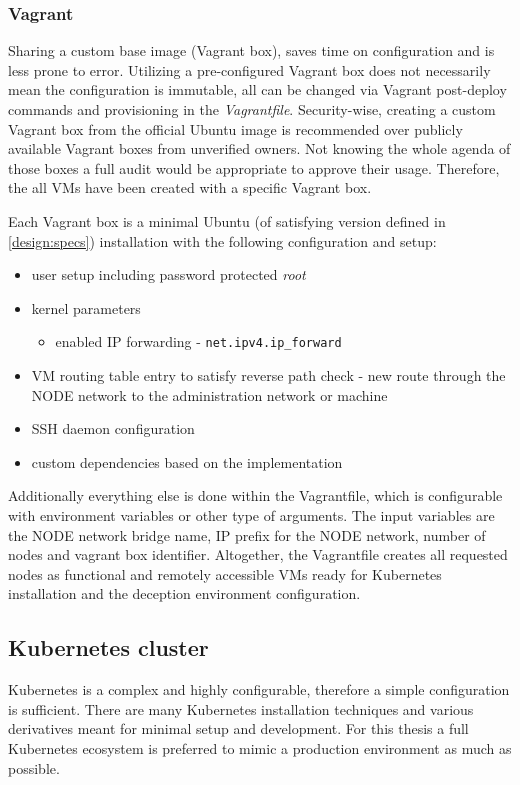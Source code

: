 \subsubsection*{Vagrant \label{design:env-arch:base:vagrant}}
Sharing a custom base image (Vagrant box), saves time on configuration and is less prone to error. Utilizing a pre-configured Vagrant box does not necessarily mean the configuration is immutable, all can be changed via Vagrant post-deploy commands and provisioning in the \textit{Vagrantfile}. Security-wise, creating a custom Vagrant box from the official Ubuntu image is recommended over publicly available Vagrant boxes from unverified owners. Not knowing the whole agenda of those boxes a full audit would be appropriate to approve their usage. Therefore, the all VMs have been created with a specific Vagrant box.

Each Vagrant box is a minimal Ubuntu (of satisfying version defined in \autoref{design:specs}) installation with the following configuration and setup:
\begin{itemize}
	\item 
	user setup including password protected \textit{root}
	\item 
	kernel parameters
	\begin{itemize}[label=$\hyphen$]
		\item
		enabled IP forwarding - \texttt{net.ipv4.ip\_forward}
	\end{itemize}
	\item 
	VM routing table entry to satisfy reverse path check - new route through the NODE network to the administration network or machine
	\item
	SSH daemon configuration
	\item 
	custom dependencies based on the implementation
\end{itemize}

Additionally everything else is done within the Vagrantfile, which is configurable with environment variables or other type of arguments. The input variables are the NODE network bridge name, IP prefix for the NODE network, number of nodes and vagrant box identifier. Altogether, the Vagrantfile creates all requested nodes as functional and remotely accessible VMs ready for Kubernetes installation and the deception environment configuration.

\subsection{Kubernetes cluster \label{design:env-arch:k8s}}
Kubernetes is a complex and highly configurable, therefore a simple configuration is sufficient. There are many Kubernetes installation techniques and various derivatives meant for minimal setup and development. For this thesis a full Kubernetes ecosystem is preferred to mimic a production environment as much as possible.

